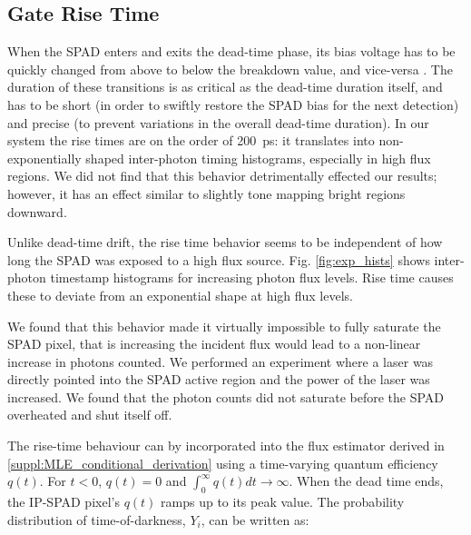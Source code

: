 \subsection*{Gate Rise Time}\label{suppl:rise time}
When the SPAD enters and exits the dead-time phase, its bias voltage
has to be quickly changed from above to below the breakdown value, and
vice-versa \cite{Buttafava2014}. The duration of these transitions is as
critical as the dead-time duration itself, and has to be short (in order to
swiftly restore the SPAD bias for the next detection) and precise (to prevent
variations in the overall dead-time duration). In our system the rise
times are on the order of \SI{200}{\pico\second}:
it translates into non-exponentially shaped inter-photon timing histograms,
especially in high flux regions. We did not find that this behavior
detrimentally effected our results; however, it has an effect similar to
slightly tone mapping bright regions downward. 

Unlike dead-time drift, the rise time behavior seems to be independent of how
long the SPAD was exposed to a high flux source. Fig.  \ref{fig:exp_hists}
shows inter-photon timestamp histograms for increasing photon flux levels. Rise
time causes these to deviate from an exponential shape at high flux levels. 

We found that this behavior made it virtually impossible to fully saturate the
SPAD pixel, that is increasing the incident flux would lead to a non-linear
increase in photons counted. We performed an experiment where a laser was
directly pointed into the SPAD active region and the power of the laser was
increased. We found that the photon counts did not saturate before the SPAD
overheated and shut itself off. 

The rise-time behaviour can by incorporated into the flux estimator derived in
\ref{suppl:MLE_conditional_derivation} using a time-varying quantum efficiency
$q(t)$. For $t<0$, $q(t)=0$ and  $\int_0^{\infty} q(t) dt \rightarrow\infty$.
When the dead time ends, the IP-SPAD pixel's $q(t)$ ramps up to its peak value.
The probability distribution of time-of-darkness, $Y_i$, can be written as:


